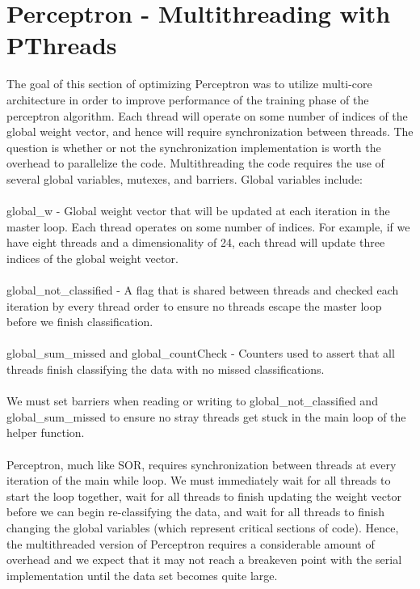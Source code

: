 \documentclass{article}
\begin{document}
\section{Perceptron - Multithreading with PThreads}
The goal of this section of optimizing Perceptron was to utilize multi-core architecture in order to improve performance of the training phase of the perceptron algorithm. Each thread will operate on some number of indices of the global weight vector, and hence will require synchronization between threads. The question is whether or not the synchronization implementation is worth the overhead to parallelize the code. Multithreading the code requires the use of several global variables, mutexes, and barriers. Global variables include:
\\ \\
global\_w - Global weight vector that will be updated at each iteration in the master loop. Each thread operates on some number of indices. For example, if we have eight threads and a dimensionality of 24, each thread will update three indices of the global weight vector. \\ \\
global\_not\_classified - A flag that is shared between threads and checked each iteration by every thread order to ensure no threads escape the master loop before we finish classification. \\ \\ 
global\_sum\_missed and global\_countCheck - Counters used to assert that all threads finish classifying the data with no missed classifications. \\ \\
We must set barriers when reading or writing to global\_not\_classified and global\_sum\_missed to ensure no stray threads get stuck in the main loop of the helper function. \\ \\
Perceptron, much like SOR, requires synchronization between threads at every iteration of the main while loop. We must immediately wait for all threads to start the loop together, wait for all threads to finish updating the weight vector before we can begin re-classifying the data, and wait for all threads to finish changing the global variables (which represent critical sections of code). Hence, the multithreaded version of Perceptron requires a considerable amount of overhead and we expect that it may not reach a breakeven point with the serial implementation until the data set becomes quite large.
\end{document}
